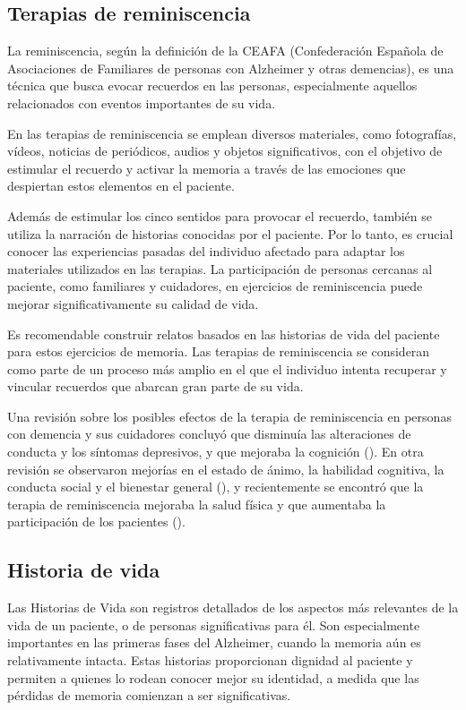 \subsection{Terapias de reminiscencia}
La reminiscencia, según la definición de la CEAFA (Confederación Española de Asociaciones de Familiares de personas con Alzheimer y otras demencias), es una técnica que busca evocar recuerdos en las personas, especialmente aquellos relacionados con eventos importantes de su vida.

En las terapias de reminiscencia se emplean diversos materiales, como fotografías, vídeos, noticias de periódicos, audios y objetos significativos, con el objetivo de estimular el recuerdo y activar la memoria a través de las emociones que despiertan estos elementos en el paciente.

Además de estimular los cinco sentidos para provocar el recuerdo, también se utiliza la narración de historias conocidas por el paciente. Por lo tanto, es crucial conocer las experiencias pasadas del individuo afectado para adaptar los materiales utilizados en las terapias. La participación de personas cercanas al paciente, como familiares y cuidadores, en ejercicios de reminiscencia puede mejorar significativamente su calidad de vida.

Es recomendable construir relatos basados en las historias de vida del paciente para estos ejercicios de memoria. Las terapias de reminiscencia se consideran como parte de un proceso más amplio en el que el individuo intenta recuperar y vincular recuerdos que abarcan gran parte de su vida.

Una revisión sobre los posibles efectos de la terapia de reminiscencia en personas con demencia y sus cuidadores concluyó que disminuía las alteraciones de conducta y los síntomas depresivos, y que mejoraba la cognición (\cite{huang2015reminiscence}). En otra revisión se observaron mejorías en el estado de ánimo, la habilidad cognitiva, la conducta social y el bienestar general (\cite{cotelli2012reminiscence}), y recientemente se encontró que la terapia de reminiscencia mejoraba la salud física y que aumentaba la participación de los pacientes (\cite{irazoki2027eficacia}).
\subsection{Historia de vida}
Las Historias de Vida son registros detallados de los aspectos más relevantes de la vida de un paciente, o de personas significativas para él. Son especialmente importantes en las primeras fases del Alzheimer, cuando la memoria aún es relativamente intacta. Estas historias proporcionan dignidad al paciente y permiten a quienes lo rodean conocer mejor su identidad, a medida que las pérdidas de memoria comienzan a ser significativas.


